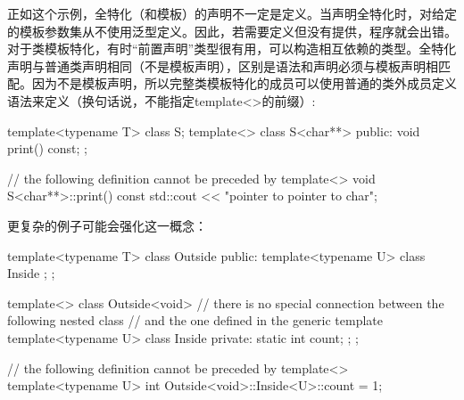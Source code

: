 
正如这个示例，全特化（和模板）的声明不一定是定义。当声明全特化时，对给定的模板参数集从不使用泛型定义。因此，若需要定义但没有提供，程序就会出错。对于类模板特化，有时“前置声明”类型很有用，可以构造相互依赖的类型。全特化声明与普通类声明相同（不是模板声明），区别是语法和声明必须与模板声明相匹配。因为不是模板声明，所以完整类模板特化的成员可以使用普通的类外成员定义语法来定义（换句话说，不能指定template<>的前缀）:

\begin{cpp}
template<typename T>
class S;
template<> class S<char**> {
	public:
	void print() const;
};

// the following definition cannot be preceded by template<>
void S<char**>::print() const
{
	std::cout << "pointer to pointer to char\n";
}
\end{cpp}

更复杂的例子可能会强化这一概念：

\begin{cpp}
template<typename T>
class Outside {
	public:
	template<typename U>
	class Inside {
	};
};

template<>
class Outside<void> {
	// there is no special connection between the following nested class
	// and the one defined in the generic template
	template<typename U>
	class Inside {
		private:
		static int count;
	};
};

// the following definition cannot be preceded by template<>
template<typename U>
int Outside<void>::Inside<U>::count = 1;
\end{cpp}

